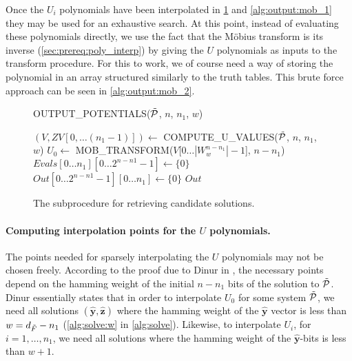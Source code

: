 Once the $U_i$ polynomials have been interpolated in \cref{alg:output:mob_0} and \cref{alg:output:mob_1} they may be used for an exhaustive search. At this point, instead of evaluating these polynomials directly, we use the fact that the Möbius transform is its inverse (\cref{sec:prereq:poly_interp}) by giving the $U$ polynomials as inputs to the transform procedure. For this to work, we of course need a way of storing the polynomial in an array structured similarly to the truth tables. This brute force approach can be seen in \cref{alg:output:mob_2}.


\begin{figure}[ht]
    \centering
    \begin{alg}
        \caption{OUTPUT\_POTENTIALS($\Tilde{\mathcal{P}}$, $n$, $n_1$, $w$)}
        \label{alg:output}
        $(V, ZV[0,\dots(n_1 - 1)]) \gets $ COMPUTE\_U\_VALUES($\Tilde{\mathcal{P}}$, $n$, $n_1$, $w$)\; \label{alg:output:uvalues}
        $U_0 \gets$ MOB\_TRANSFORM($V$[$0\dots |W^{n - n_1}_{w}| - 1$], $n - n_1$)\; \label{alg:output:mob_0}
        $Evals[0\dots n_1][0\dots 2^{n - n1} - 1] \gets \{0\}$\;
        $Out[0\dots 2^{n - n1} - 1][0\dots n_1] \gets \{0\}$\;
        \Return $Out$\;
    \end{alg}
    \caption{The subprocedure for retrieving candidate solutions.}
\end{figure}

\paragraph{Computing interpolation points for the $U$ polynomials.} The points needed for sparsely interpolating the $U$ polynomials may not be chosen freely. According to the proof due to Dinur in \cite{cryptoeprint:2021/578}, the necessary points depend on the hamming weight of the initial $n - n_1$ bits of the solution to $\Tilde{\mathcal{P}}$. Dinur essentially states that in order to interpolate $U_0$ for some system $\Tilde{\mathcal{P}}$, we need all solutions $(\hat{\mathbf{y}}, \hat{\mathbf{z}})$ where the hamming weight of the $\hat{\mathbf{y}}$ vector is less than $w = d_{\Tilde{F}} - n_1$ (\cref{alg:solve:w} in \cref{alg:solve}). Likewise, to interpolate $U_i$, for $i = 1, \dots, n_1$, we need all solutions where the hamming weight of the $\hat{\mathbf{y}}$-bits is less than $w + 1$.

